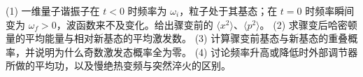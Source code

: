 (1) 一维量子谐振子在 \(t<0\) 时频率为 \(\omega_i\)，粒子处于其基态；在 \(t=0\) 时频率瞬间变为 \(\omega_f>0\)，波函数来不及变化。给出骤变前的 \(\langle x^2\rangle\)、\(\langle p^2\rangle\)。
(2) 求骤变后哈密顿量的平均能量与相对新基态的平均激发数。
(3) 计算骤变前基态与新基态的重叠概率，并说明为什么奇数激发态概率全为零。
(4) 讨论频率升高或降低时外部调节器所做的平均功，以及慢绝热变频与突然淬火的区别。
